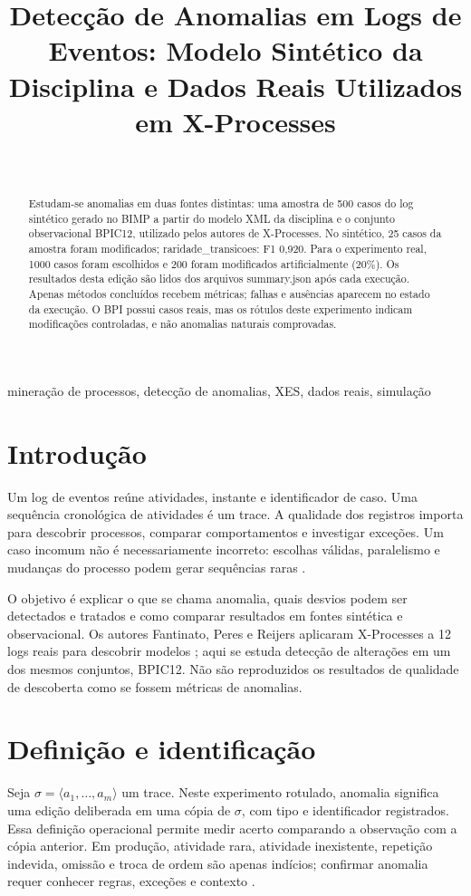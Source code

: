 \documentclass[conference]{IEEEtran}
\title{Detecção de Anomalias em Logs de Eventos: Modelo Sintético da Disciplina e Dados Reais Utilizados em X-Processes}
\author{\IEEEauthorblockN{Vanderleia Matos Costa e colaboradores}\\\IEEEauthorblockA{SIN5025 --- Mineração de Processos\\Universidade de São Paulo}}
\begin{document}
\maketitle
\begin{abstract}
Estudam-se anomalias em duas fontes distintas: uma amostra de 500 casos do log sintético gerado no BIMP a partir do modelo XML da disciplina e o conjunto observacional BPIC12, utilizado pelos autores de X-Processes. No sintético, 25 casos da amostra foram modificados; raridade\_transicoes: F1 0,920. Para o experimento real, 1000 casos foram escolhidos e 200 foram modificados artificialmente (20\%). Os resultados desta edição são lidos dos arquivos summary.json após cada execução. Apenas métodos concluídos recebem métricas; falhas e ausências aparecem no estado da execução. O BPI possui casos reais, mas os rótulos deste experimento indicam modificações controladas, e não anomalias naturais comprovadas.
\end{abstract}
\begin{IEEEkeywords}mineração de processos, detecção de anomalias, XES, dados reais, simulação\end{IEEEkeywords}
\section{Introdução}
Um log de eventos reúne atividades, instante e identificador de caso. Uma sequência cronológica de atividades é um trace. A qualidade dos registros importa para descobrir processos, comparar comportamentos e investigar exceções. Um caso incomum não é necessariamente incorreto: escolhas válidas, paralelismo e mudanças do processo podem gerar sequências raras \cite{vanderaalst2016process,vanderaalstcarmona2022handbook}.

O objetivo é explicar o que se chama anomalia, quais desvios podem ser detectados e tratados e como comparar resultados em fontes sintética e observacional. Os autores Fantinato, Peres e Reijers aplicaram X-Processes a 12 logs reais para descobrir modelos \cite{fantinato2023xprocesses}; aqui se estuda detecção de alterações em um dos mesmos conjuntos, BPIC12. Não são reproduzidos os resultados de qualidade de descoberta como se fossem métricas de anomalias.

\section{Definição e identificação}
Seja $\sigma=\langle a_1,\ldots,a_m\rangle$ um trace. Neste experimento rotulado, anomalia significa uma edição deliberada em uma cópia de $\sigma$, com tipo e identificador registrados. Essa definição operacional permite medir acerto comparando a observação com a cópia anterior. Em produção, atividade rara, atividade inexistente, repetição indevida, omissão e troca de ordem são apenas indícios; confirmar anomalia requer conhecer regras, exceções e contexto \cite{suriadi2017patterns}.
\end{document}
